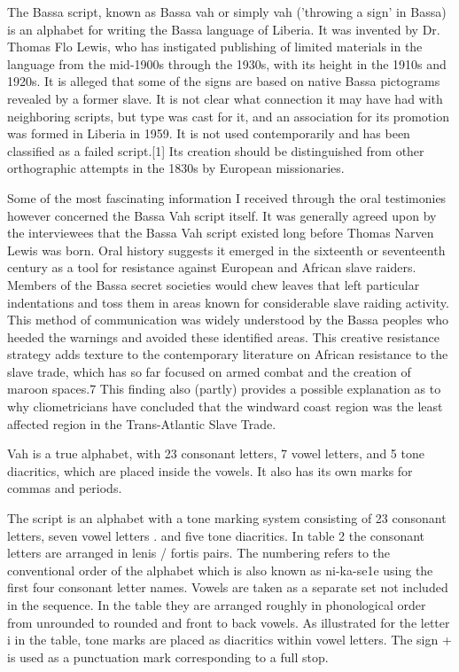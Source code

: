 The Bassa script, known as Bassa vah or simply vah ('throwing a sign' in Bassa) is an alphabet for writing the Bassa language of Liberia. It was invented by Dr. Thomas Flo Lewis, who has instigated publishing of limited materials in the language from the mid-1900s through the 1930s, with its height in the 1910s and 1920s. It is alleged that some of the signs are based on native Bassa pictograms revealed by a former slave. It is not clear what connection it may have had with neighboring scripts, but type was cast for it, and an association for its promotion was formed in Liberia in 1959. It is not used contemporarily and has been classified as a failed script.[1] Its creation should be distinguished from other orthographic attempts in the 1830s by European missionaries.

\begin{latexquotation}
Some of the most fascinating information I received through the oral testimonies however
concerned the Bassa Vah script itself. It was generally agreed upon by the interviewees that the
Bassa Vah script existed long before Thomas Narven Lewis was born. Oral history suggests it
emerged in the sixteenth or seventeenth century as a tool for resistance against European and
African slave raiders. Members of the Bassa secret societies would chew leaves that left particular
indentations and toss them in areas known for considerable slave raiding activity. This method of
communication was widely understood by the Bassa peoples who heeded the warnings and avoided
these identified areas. This creative resistance strategy adds texture to the contemporary literature on
African resistance to the slave trade, which has so far focused on armed combat and the creation of
maroon spaces.7 This finding also (partly) provides a possible explanation as to why cliometricians
have concluded that the windward coast region was the least affected region in the Trans-Atlantic
Slave Trade.
\end{latexquotation}

Vah is a true alphabet, with 23 consonant letters, 7 vowel letters, and 5 tone diacritics, which are placed inside the vowels. It also has its own marks for commas and periods.

The script is an alphabet with a tone marking system consisting of 23 consonant
letters, seven vowel letters . and five tone diacritics. In table 2 the consonant
letters are arranged in lenis / fortis pairs. The numbering refers to the conventional
order of the alphabet which is also known as ni-ka-se1e using the first four consonant
letter names. Vowels are taken as a separate set not included in the
sequence. In the table they are arranged roughly in phonological order from
unrounded to rounded and front to back vowels. As illustrated for the letter i in
the table, tone marks are placed as diacritics within vowel letters. The sign + is
used as a punctuation mark corresponding to a full stop.


